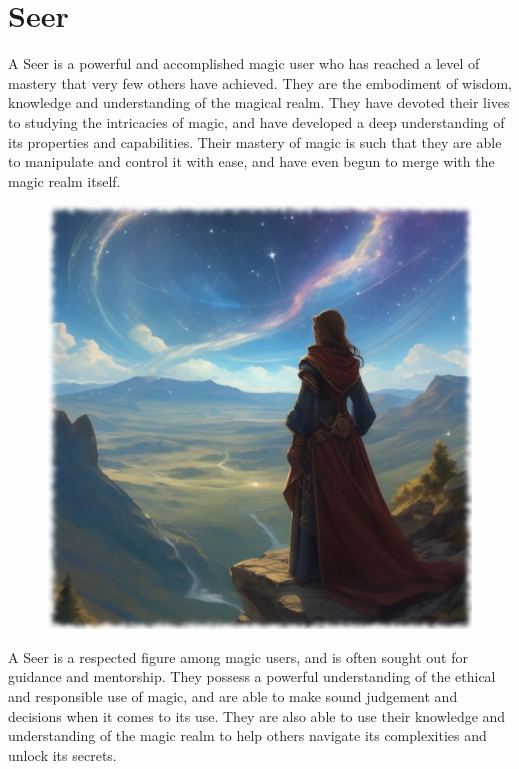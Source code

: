 \section{Seer}
A Seer is a powerful and accomplished magic user who has reached a level of mastery that very few others have achieved. They are the embodiment of wisdom, knowledge and understanding of the magical realm. They have devoted their lives to studying the intricacies of magic, and have developed a deep understanding of its properties and capabilities. Their mastery of magic is such that they are able to manipulate and control it with ease, and have even begun to merge with the magic realm itself.

\begin{figure}[h]
\begin{center}
\includegraphics[scale=0.24]{img/ai-images/seer.png}
\end{center}
\end{figure}

A Seer is a respected figure among magic users, and is often sought out for guidance and mentorship. They possess a powerful understanding of the ethical and responsible use of magic, and are able to make sound judgement and decisions when it comes to its use. They are also able to use their knowledge and understanding of the magic realm to help others navigate its complexities and unlock its secrets.

